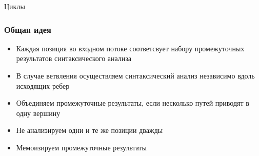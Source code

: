 \documentclass[xcolor=table]{beamer}
\begin{document}
\begin{frame}[fragile]
\begin{multicols}{2}
\columnbreak

\pause

\begin{center} Циклы \end{center}
\begin{center}
\end{center}
\end{multicols}
\end{frame}

\begin{frame}[fragile]
  \transwipe[direction=90]
  \frametitle{Общая идея}
\begin{itemize}
  \item Каждая позиция во входном потоке соответсвует набору промежуточных результатов синтаксического анализа
  \item В случае ветвления осуществляем синтаксический анализ независимо вдоль исходящих ребер
  \item Объединяем промежуточные результаты, если несколько путей приводят в одну вершину
  \item Не анализируем одни и те же позиции дважды
  \item Мемоизируем промежуточные результаты
\end{itemize}
\end{frame}
\end{document}
